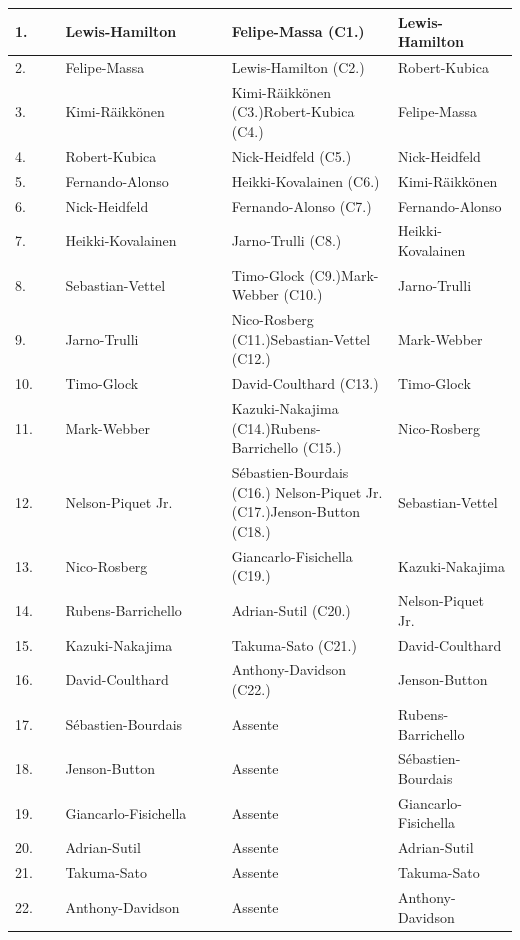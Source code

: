 \documentclass[12pt,a4paper,openright,twoside]{book}
\begin{document}
\begin{table}[H]
{\begin{tabular}{|p{0.1\linewidth}|p{0.33\linewidth}|p{0.33\linewidth}|p{0.33\linewidth}|}
    1. &	Lewis-Hamilton & 	 Felipe-Massa (C1.)& 	 Lewis-Hamilton 	 \\ \hline
    2.&	Felipe-Massa & 	 Lewis-Hamilton (C2.)& 	 Robert-Kubica 	 \\ \hline
    3.&	Kimi-Räikkönen & 	 Kimi-Räikkönen (C3.)\newline Robert-Kubica (C4.)& 	 Felipe-Massa 	 \\ \hline
    4.&	Robert-Kubica & 	 Nick-Heidfeld (C5.)& 	 Nick-Heidfeld 	 \\ \hline
    5.&	Fernando-Alonso & 	 Heikki-Kovalainen (C6.)& 	 Kimi-Räikkönen 	 \\ \hline
    6.&	Nick-Heidfeld & 	 Fernando-Alonso (C7.) & 	 Fernando-Alonso 	 \\ \hline
    7.&	Heikki-Kovalainen & 	 Jarno-Trulli (C8.)& 	 Heikki-Kovalainen 	 \\ \hline
    8.&	Sebastian-Vettel & 	 Timo-Glock (C9.)\newline Mark-Webber (C10.) & 	 Jarno-Trulli 	 \\ \hline
    9.&	Jarno-Trulli & 	 Nico-Rosberg (C11.)\newline Sebastian-Vettel (C12.) & 	 Mark-Webber 	 \\ \hline
    10.&	Timo-Glock & 	 David-Coulthard (C13.) & 	 Timo-Glock 	 \\ \hline
    11.	&Mark-Webber & 	 Kazuki-Nakajima (C14.)\newline Rubens-Barrichello (C15.) & 	 Nico-Rosberg 	 \\ \hline
    12.	&Nelson-Piquet Jr. & 	 Sébastien-Bourdais (C16.) \newline Nelson-Piquet Jr. (C17.)\newline Jenson-Button (C18.) & 	 Sebastian-Vettel 	 \\ \hline
    13.&	Nico-Rosberg & 	 Giancarlo-Fisichella (C19.) & 	 Kazuki-Nakajima 	 \\ \hline
    14.	&Rubens-Barrichello & 	 Adrian-Sutil (C20.)& 	 Nelson-Piquet Jr. 	 \\ \hline
    15.&	Kazuki-Nakajima & 	 Takuma-Sato (C21.) & 	 David-Coulthard 	 \\ \hline
    16.&	David-Coulthard & 	 Anthony-Davidson (C22.)& 	 Jenson-Button 	 \\ \hline
    17.&	Sébastien-Bourdais & 	 Assente & 	 Rubens-Barrichello 	 \\ \hline
    18.&	Jenson-Button & 	 Assente & 	 Sébastien-Bourdais 	 \\ \hline
    19.&	Giancarlo-Fisichella & 	 Assente & 	 Giancarlo-Fisichella 	 \\ \hline
    20.&	Adrian-Sutil & 	 Assente & 	 Adrian-Sutil 	 \\ \hline
    21.&	Takuma-Sato & 	 Assente & 	 Takuma-Sato 	 \\ \hline
    22.&	Anthony-Davidson & 	 Assente & 	 Anthony-Davidson 	 \\ \hline
    

\end{tabular}}
\end{table}
\end{document}
